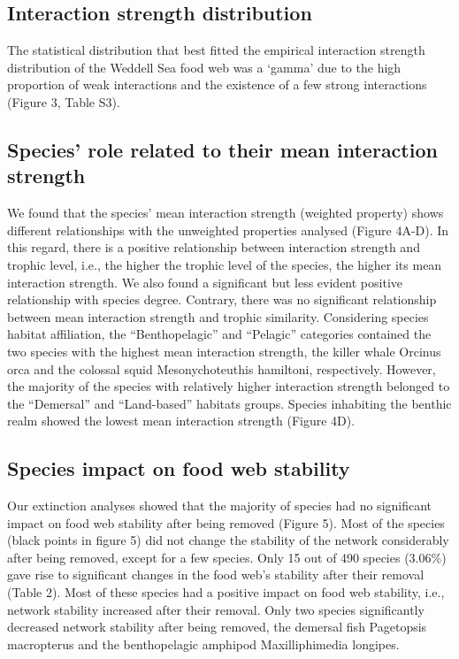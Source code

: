 \documentclass[gc, manuscript]{copernicus}
\begin{document}
\subsection{Interaction strength distribution}

The statistical distribution that best fitted the empirical interaction
strength distribution of the Weddell Sea food web was a `gamma' due to
the high proportion of weak interactions and the existence of a few
strong interactions (Figure 3, Table S3).

\subsection{Species' role related to their mean interaction strength}

We found that the species' mean interaction strength (weighted property)
shows different relationships with the unweighted properties analysed
(Figure 4A-D). In this regard, there is a positive relationship between
interaction strength and trophic level, i.e., the higher the trophic
level of the species, the higher its mean interaction strength. We also
found a significant but less evident positive relationship with species
degree. Contrary, there was no significant relationship between mean
interaction strength and trophic similarity. Considering species habitat
affiliation, the ``Benthopelagic'' and ``Pelagic'' categories contained
the two species with the highest mean interaction strength, the killer
whale Orcinus orca and the colossal squid Mesonychoteuthis hamiltoni,
respectively. However, the majority of the species with relatively
higher interaction strength belonged to the ``Demersal'' and
``Land-based'' habitats groups. Species inhabiting the benthic realm
showed the lowest mean interaction strength (Figure 4D).

\subsection{Species impact on food web stability}

Our extinction analyses showed that the majority of species had no
significant impact on food web stability after being removed (Figure 5).
Most of the species (black points in figure 5) did not change the
stability of the network considerably after being removed, except for a
few species. Only 15 out of 490 species (3.06\%) gave rise to
significant changes in the food web's stability after their removal
(Table 2). Most of these species had a positive impact on food web
stability, i.e., network stability increased after their removal. Only
two species significantly decreased network stability after being
removed, the demersal fish Pagetopsis macropterus and the benthopelagic
amphipod Maxilliphimedia longipes.
\end{document}
